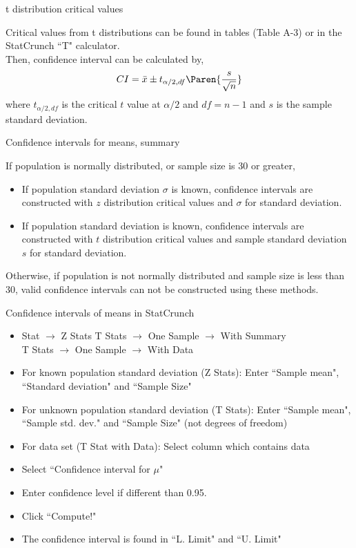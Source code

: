 \documentclass[xcolor=table]{beamer}
\begin{document}
\begin{frame}{t distribution critical values}
\begin{block}{}
\large
Critical values from t distributions can be found in tables (Table A-3) or in the StatCrunch ``T" calculator.\\
\pause\medskip
Then, confidence interval can be calculated by,
\[CI = \bar x \pm t_{\alpha/2, df} \Paren{\frac s {\sqrt n}}\]
where $t_{\alpha/2, df}$ is the critical $t$ value at $\alpha/2$ and $df=n-1$ and $s$ is the sample standard deviation.
\end{block}
\end{frame}

\begin{frame}{Confidence intervals for means, summary}
\begin{block}{}
\large
If population is normally distributed, or sample size is 30 or greater,
\begin{itemize}
\pause\item If population standard deviation $\sigma$ is known, confidence intervals are constructed with $z$ distribution critical values and $\sigma$ for standard deviation.
\pause\item If population standard deviation is  known, confidence intervals are constructed with $t$ distribution critical values and sample standard deviation $s$ for standard deviation.
\end{itemize}
\pause Otherwise, if population is not normally distributed and sample size is less than 30, valid confidence intervals can not be constructed using these methods.
\end{block}
\end{frame}

\begin{frame}{Confidence intervals of means in StatCrunch}
\begin{block}{}
\large
\begin{itemize}
\item Stat $\to$ Z Stats  T Stats $\to$ One Sample $\to$ With Summary \\T Stats $\to$ One Sample $\to$ With Data
\item For known population standard deviation (Z Stats): Enter ``Sample mean", ``Standard deviation" and ``Sample Size" 
\item For unknown population standard deviation (T Stats): Enter ``Sample mean", ``Sample std. dev." and ``Sample Size" (not degrees of freedom)
\item For data set (T Stat with Data): Select column which contains data
\item Select ``Confidence interval for $\mu$"
\item Enter confidence level if different than 0.95.
\item Click ``Compute!"
\item The confidence interval is found in ``L. Limit" and ``U. Limit"
\end{itemize}
\end{block}
\end{frame}
\end{document}
